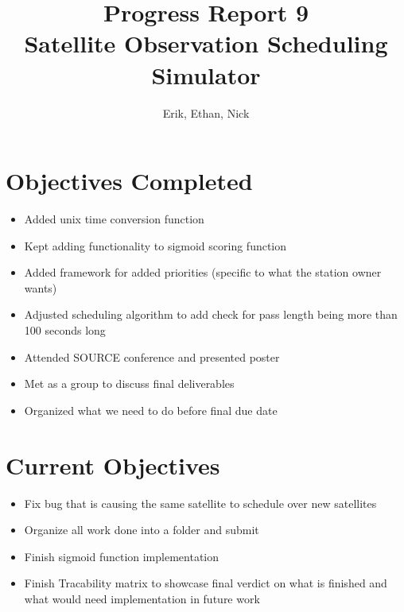 \documentclass{article}
\title{Progress Report 9\\ Satellite Observation Scheduling Simulator}
\author{Erik, Ethan, Nick}
\begin{document}
\maketitle

\section{Objectives Completed}

\begin{itemize}
	\item Added unix time conversion function
	\item Kept adding functionality to sigmoid scoring function
  \item Added framework for added priorities (specific to what the station owner wants)
  \item Adjusted scheduling algorithm to add check for pass length being more than 100 seconds long
  \item Attended SOURCE conference and presented poster
  \item Met as a group to discuss final deliverables
  \item Organized what we need to do before final due date
\end{itemize}

\section{Current Objectives}

\begin{itemize}
  \item Fix bug that is causing the same satellite to schedule over new satellites
  \item Organize all work done into a folder and submit
  \item Finish sigmoid function implementation
  \item Finish Tracability matrix to showcase final verdict on what is finished and what would need implementation in future work
\end{itemize}
\end{document}
